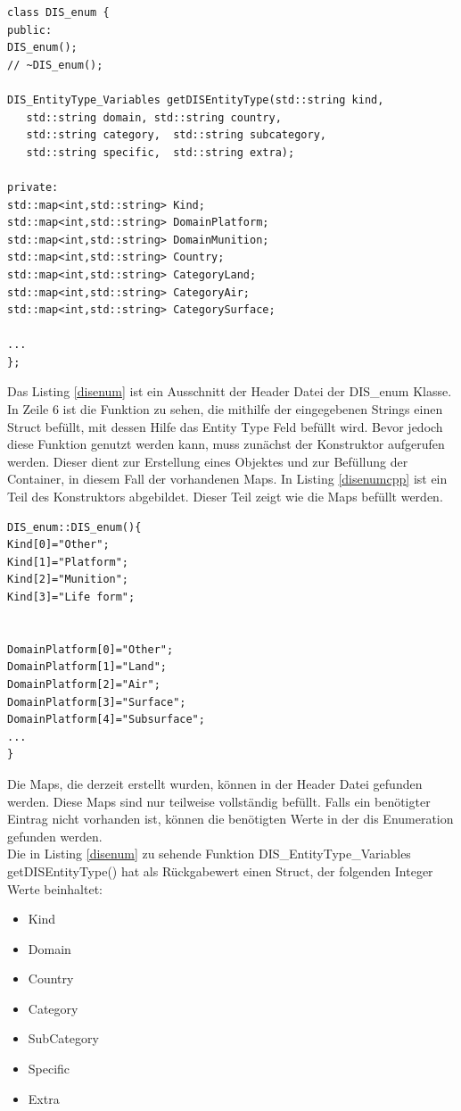 \begin{lstlisting}[caption = Ausschnitt DIS\_enum.h  ,label= disenum]
class DIS_enum {
public:
DIS_enum();
// ~DIS_enum();

DIS_EntityType_Variables getDISEntityType(std::string kind,
   std::string domain, std::string country,
   std::string category,  std::string subcategory, 
   std::string specific,  std::string extra);

private:
std::map<int,std::string> Kind;
std::map<int,std::string> DomainPlatform;
std::map<int,std::string> DomainMunition;
std::map<int,std::string> Country;
std::map<int,std::string> CategoryLand;
std::map<int,std::string> CategoryAir;
std::map<int,std::string> CategorySurface;

...
};
\end{lstlisting}
Das Listing \ref{disenum} ist ein Ausschnitt der Header Datei der \glqq DIS\_enum \grqq{} Klasse. In Zeile 6 ist die Funktion zu sehen, die mithilfe der eingegebenen Strings einen Struct befüllt, mit dessen Hilfe das   \glqq Entity Type \grqq{} Feld befüllt wird. Bevor jedoch diese Funktion genutzt werden kann, muss zunächst der Konstruktor aufgerufen werden. Dieser dient zur Erstellung eines Objektes und zur Befüllung der Container, in diesem Fall der vorhandenen Maps. In Listing \ref{disenumcpp} ist ein Teil des Konstruktors abgebildet. Dieser Teil zeigt wie die Maps befüllt werden.
 \begin{lstlisting}[caption = Ausschnitt DIS\_enum.cpp  ,label= disenumcpp]
DIS_enum::DIS_enum(){
Kind[0]="Other";
Kind[1]="Platform";
Kind[2]="Munition";
Kind[3]="Life form";
 
 
DomainPlatform[0]="Other";
DomainPlatform[1]="Land";
DomainPlatform[2]="Air";
DomainPlatform[3]="Surface";
DomainPlatform[4]="Subsurface";
...
}
 \end{lstlisting}
 Die Maps, die derzeit erstellt wurden, können in der Header Datei gefunden werden. Diese Maps sind nur teilweise vollständig befüllt. Falls ein benötigter Eintrag nicht vorhanden ist, können die benötigten Werte in der \ac{dis} Enumeration \cite{Shanks.} gefunden werden. \\ \newpage
 Die in Listing \ref{disenum} zu sehende Funktion \glqq DIS\_EntityType\_Variables getDISEntityType()\grqq{} 
hat als Rückgabewert einen Struct, der folgenden Integer Werte beinhaltet: 
\begin{itemize}
	\singlespacing
	\item Kind
	\item Domain
	\item Country
	\item Category
	\item SubCategory
	\item Specific
	\item Extra
\end{itemize}
